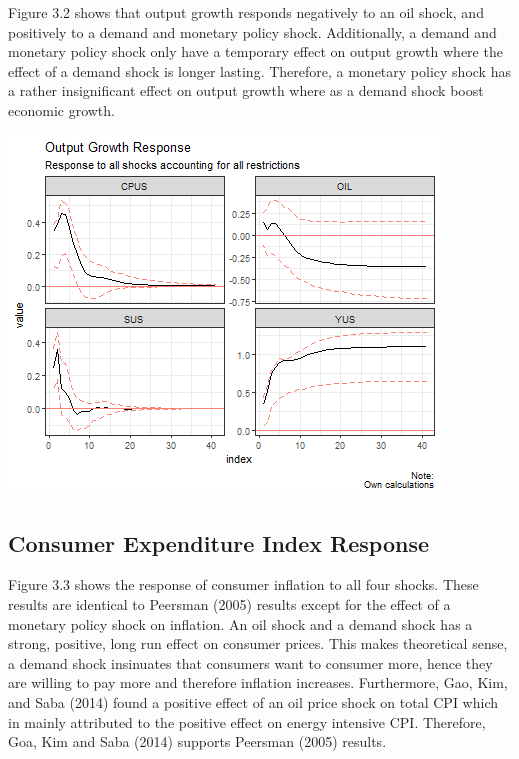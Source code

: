 \documentclass[11pt,preprint, authoryear]{elsarticle}
\let\origfigure\figure
\let\endorigfigure\endfigure
\renewenvironment{figure}[1][2] {
    \expandafter\origfigure\expandafter[H]
} {
    \endorigfigure
}
\numberwithin{equation}{section}
\numberwithin{figure}{section}
\numberwithin{table}{section}
\begin{document}
Figure 3.2 shows that output growth responds negatively to an oil shock,
and positively to a demand and monetary policy shock. Additionally, a
demand and monetary policy shock only have a temporary effect on output
growth where the effect of a demand shock is longer lasting. Therefore,
a monetary policy shock has a rather insignificant effect on output
growth where as a demand shock boost economic growth.

\begin{figure}[H]

{\centering \includegraphics{replication_files/figure-latex/Figure3-1} 

}

\caption{Response of Output growth\label{Figure3}}\label{fig:Figure3}
\end{figure}

\hypertarget{consumer-expenditure-index-response}{%
\subsection{Consumer Expenditure Index
Response}\label{consumer-expenditure-index-response}}

Figure 3.3 shows the response of consumer inflation to all four shocks.
These results are identical to Peersman (2005) results except for the
effect of a monetary policy shock on inflation. An oil shock and a
demand shock has a strong, positive, long run effect on consumer prices.
This makes theoretical sense, a demand shock insinuates that consumers
want to consumer more, hence they are willing to pay more and therefore
inflation increases. Furthermore, Gao, Kim, and Saba (2014) found a
positive effect of an oil price shock on total CPI which in mainly
attributed to the positive effect on energy intensive CPI. Therefore,
Goa, Kim and Saba (2014) supports Peersman (2005) results.
\end{document}
